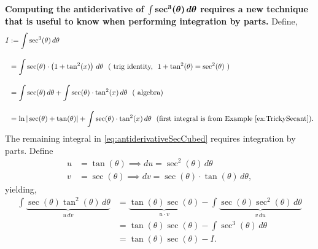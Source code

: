 
\textbf{Computing the antiderivative of  $\bm{ \mathrm{\bf \int} \sec^3(\theta) \, d\theta}$ requires a new technique that is useful to know when performing integration by parts.} Define,
\begin{equation}
\label{eq:antiderivativeSecCubed}
\begin{aligned}
    I &:=  \int \sec^3(\theta) \, d\theta \\[1em]
    &= \int  \sec(\theta)  \cdot \left( 1 + \tan^2(x) \right)\, d\theta ~~(~\text{trig identity,}~~  1 + \tan^2(\theta) = \sec^2(\theta)~)\\[1em]
    & =  \int  \sec(\theta) \, d\theta +  \int  \sec(\theta)  \cdot  \tan^2(x) \, d\theta ~~(~\text{algebra} ) \\[1em] 
    & =  \ln|\sec(\theta) + \tan(\theta)| + \int  \sec(\theta)  \cdot  \tan^2(x) \, d\theta ~~(\text{first integral is from Example~\ref{ex:TrickySecant}}).
\end{aligned}    
\end{equation}
The remaining integral in \eqref{eq:antiderivativeSecCubed} requires integration by parts. Define 
\begin{align*}
    u &= \tan(\theta)  \implies  du = \sec^2(\theta) \, d\theta \\
    v& = \sec(\theta)  \implies  dv = \sec(\theta) \cdot \tan(\theta) \, d\theta , 
\end{align*}
yielding,
\begin{equation}
\label{eq:antiderivativeSecCubedStep2}
\begin{aligned}
    \int \underbrace{\sec(\theta) \tan^2(\theta) \, d\theta}_{u\, dv} &= \underbrace{\tan(\theta) \sec(\theta)}_{u\cdot v} - \int \underbrace{\sec(\theta) \sec^2(\theta) \, d\theta}_{v \, du} \\[1em]
    & = \tan(\theta) \sec(\theta) - \int \sec^3(\theta) \, d\theta \\[1em]
    & =  \tan(\theta) \sec(\theta) - I.
\end{aligned}
\end{equation}

